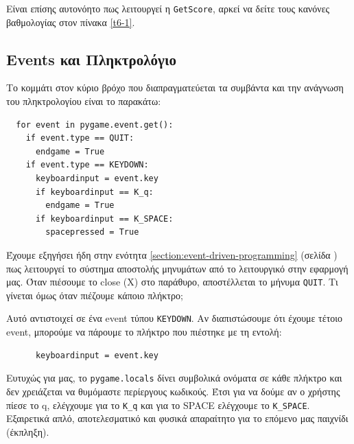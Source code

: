 Είναι επίσης αυτονόητο πως λειτουργεί η {\tt GetScore}, αρκεί να δείτε τους
κανόνες βαθμολογίας στον πίνακα \ref{t6-1}.
\newpage
%
\subsection{Events και Πληκτρολόγιο}
%
Το κομμάτι στον κύριο βρόχο που διαπραγματεύεται τα συμβάντα και την ανάγνωση του πληκτρολογίου είναι το παρακάτω:

\begin{verbatim}
  for event in pygame.event.get():
    if event.type == QUIT:
      endgame = True
    if event.type == KEYDOWN:
      keyboardinput = event.key
      if keyboardinput == K_q:
        endgame = True
      if keyboardinput == K_SPACE:
        spacepressed = True
\end{verbatim}

Έχουμε εξηγήσει ήδη στην ενότητα \ref{section:event-driven-programming} (σελίδα \pageref{section:event-driven-programming}) πως λειτουργεί το σύστημα αποστολής μηνυμάτων από το λειτουργικό στην εφαρμογή μας. Όταν πιέσουμε το close (X) στο παράθυρο, αποστέλλεται το μήνυμα {\tt QUIT}. Τι γίνεται όμως όταν πιέζουμε κάποιο πλήκτρο;

Αυτό αντιστοιχεί σε ένα event τύπου {\tt KEYDOWN}. Αν διαπιστώσουμε ότι έχουμε τέτοιο event, μπορούμε να πάρουμε το πλήκτρο που πιέστηκε με τη εντολή:

\begin{verbatim}
      keyboardinput = event.key
\end{verbatim}

Ευτυχώς για μας, το {\tt pygame.locals} δίνει συμβολικά ονόματα σε κάθε πλήκτρο
και δεν χρειάζεται να θυμόμαστε περίεργους κωδικούς. Έτσι για να δούμε αν ο
χρήστης πίεσε το q, ελέγχουμε για το {\tt K\_q} και για το SPACE ελέγχουμε
το {\tt K\_SPACE}. Εξαιρετικά απλό, αποτελεσματικό και φυσικά απαραίτητο για το επόμενο μας παιχνίδι (έκπληξη).

